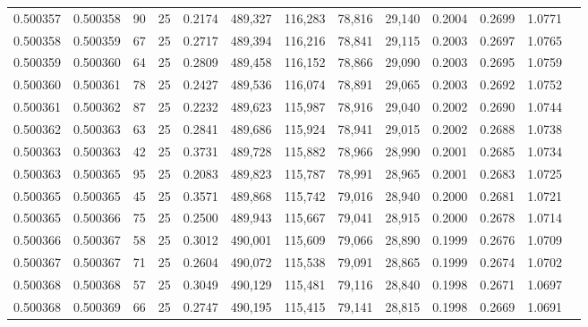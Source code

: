 \begin{tabular}{rrrrrrrrrrrrr}
0.500357 & 0.500358 &  90 &  25 &                                     0.2174 & 489,327 & 116,283 &  78,816 &  29,140 & 0.2004 & 0.2699 & 1.0771 \\
0.500358 & 0.500359 &  67 &  25 &                                     0.2717 & 489,394 & 116,216 &  78,841 &  29,115 & 0.2003 & 0.2697 & 1.0765 \\
0.500359 & 0.500360 &  64 &  25 &                                     0.2809 & 489,458 & 116,152 &  78,866 &  29,090 & 0.2003 & 0.2695 & 1.0759 \\
0.500360 & 0.500361 &  78 &  25 &                                     0.2427 & 489,536 & 116,074 &  78,891 &  29,065 & 0.2003 & 0.2692 & 1.0752 \\
0.500361 & 0.500362 &  87 &  25 &                                     0.2232 & 489,623 & 115,987 &  78,916 &  29,040 & 0.2002 & 0.2690 & 1.0744 \\
0.500362 & 0.500363 &  63 &  25 &                                     0.2841 & 489,686 & 115,924 &  78,941 &  29,015 & 0.2002 & 0.2688 & 1.0738 \\
0.500363 & 0.500363 &  42 &  25 &                                     0.3731 & 489,728 & 115,882 &  78,966 &  28,990 & 0.2001 & 0.2685 & 1.0734 \\
0.500363 & 0.500365 &  95 &  25 &                                     0.2083 & 489,823 & 115,787 &  78,991 &  28,965 & 0.2001 & 0.2683 & 1.0725 \\
0.500365 & 0.500365 &  45 &  25 &                                     0.3571 & 489,868 & 115,742 &  79,016 &  28,940 & 0.2000 & 0.2681 & 1.0721 \\
0.500365 & 0.500366 &  75 &  25 &                                     0.2500 & 489,943 & 115,667 &  79,041 &  28,915 & 0.2000 & 0.2678 & 1.0714 \\
0.500366 & 0.500367 &  58 &  25 &                                     0.3012 & 490,001 & 115,609 &  79,066 &  28,890 & 0.1999 & 0.2676 & 1.0709 \\
0.500367 & 0.500367 &  71 &  25 &                                     0.2604 & 490,072 & 115,538 &  79,091 &  28,865 & 0.1999 & 0.2674 & 1.0702 \\
0.500368 & 0.500368 &  57 &  25 &                                     0.3049 & 490,129 & 115,481 &  79,116 &  28,840 & 0.1998 & 0.2671 & 1.0697 \\
0.500368 & 0.500369 &  66 &  25 &                                     0.2747 & 490,195 & 115,415 &  79,141 &  28,815 & 0.1998 & 0.2669 & 1.0691 \\

\end{tabular}
